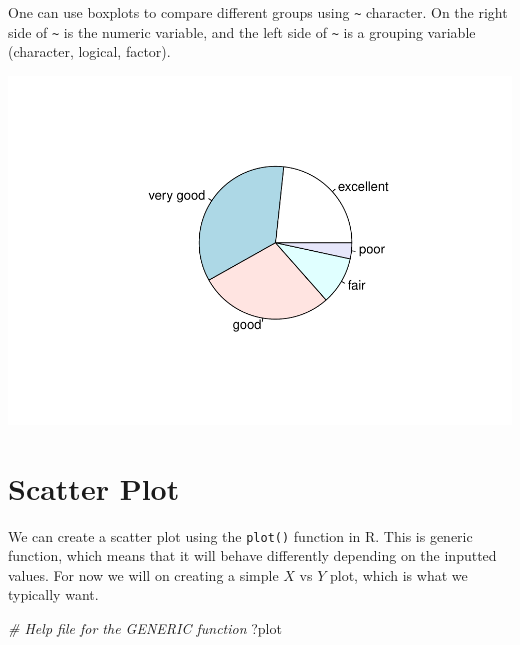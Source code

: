 \documentclass[
]{book}
\newenvironment{Shaded}{\begin{snugshade}}{\end{snugshade}}
\newcommand{\CommentTok}[1]{\textcolor[rgb]{0.56,0.35,0.01}{\textit{#1}}}
\newcommand{\DecValTok}[1]{\textcolor[rgb]{0.00,0.00,0.81}{#1}}
\newcommand{\KeywordTok}[1]{\textcolor[rgb]{0.13,0.29,0.53}{\textbf{#1}}}
\newcommand{\NormalTok}[1]{#1}
\newcommand{\OperatorTok}[1]{\textcolor[rgb]{0.81,0.36,0.00}{\textbf{#1}}}
\newcommand{\StringTok}[1]{\textcolor[rgb]{0.31,0.60,0.02}{#1}}
\begin{document}
One can use boxplots to compare different groups using \texttt{\textasciitilde{}} character. On the right side of \texttt{\textasciitilde{}} is the numeric variable, and the left side of \texttt{\textasciitilde{}} is a grouping variable (character, logical, factor).

\begin{Shaded}
\end{Shaded}

\includegraphics{_main_files/figure-latex/unnamed-chunk-135-1.pdf}

\hypertarget{scatter-plot}{%
\section{Scatter Plot}\label{scatter-plot}}

We can create a scatter plot using the \texttt{plot()} function in R. This is generic function, which means that it will behave differently depending on the inputted values. For now we will on creating a simple \(X\) vs \(Y\) plot, which is what we typically want.

\begin{Shaded}
\begin{Highlighting}[]
\CommentTok{# Help file for the GENERIC function}
\NormalTok{?plot}
\end{Highlighting}
\end{Shaded}
\end{document}
